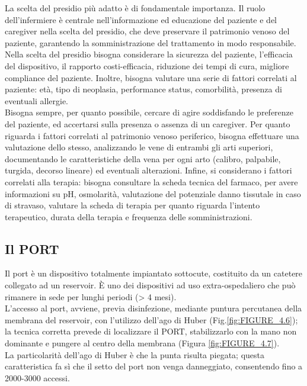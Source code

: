 La scelta del presidio più adatto è di fondamentale importanza. Il ruolo dell'infermiere è centrale 
nell'informazione ed educazione del paziente e del caregiver nella scelta del presidio, che deve preservare 
il patrimonio venoso del paziente, garantendo la somministrazione del trattamento in modo responsabile\cite{AIOMCVC}. 
Nella scelta del presidio bisogna considerare la sicurezza del paziente, l'efficacia del dispositivo, il rapporto 
costi-efficacia, riduzione dei tempi di cura, migliore compliance del paziente. Inoltre, bisogna valutare una serie 
di fattori correlati al paziente: età, tipo di  neoplasia, performance status, comorbilità, presenza 
di eventuali allergie\cite{AIOMCVC}.\\
Bisogna sempre, per quanto possibile, cercare di agire soddisfando le preferenze del paziente, 
ed accertarsi sulla presenza o assenza di un caregiver. Per quanto riguarda i fattori correlati al patrimonio 
venoso periferico, bisogna effettuare una valutazione dello stesso, analizzando le vene di entrambi gli arti superiori,
documentando le caratteristiche della vena per ogni arto (calibro, palpabile, turgida, decorso lineare) ed eventuali 
alterazioni\cite{AIOMCVC}. Infine, si considerano i fattori correlati alla terapia: bisogna consultare la scheda tecnica del farmaco,
per avere informazioni su pH, osmolarità, valutazione del potenziale danno tissutale in caso di stravaso, valutare la 
scheda di terapia per quanto riguarda l'intento terapeutico, durata della terapia e frequenza delle somministrazioni\cite{AIOMCVC}.

\subsection{Il PORT}

Il port è un dispositivo totalmente impiantato sottocute, costituito da un catetere collegato ad un reservoir\cite{AIOMCVC}.
È uno dei dispositivi ad uso extra-ospedaliero che può rimanere in sede per lunghi periodi (> 4 mesi)\cite{GAVECELTracc2021}.\\
L'accesso al port, avviene, previa disinfezione, mediante puntura percutanea della membrana del reservoir, con 
l'utilizzo dell'ago di Huber (Fig.\ref{fig:FIGURE_4.6}); la tecnica corretta prevede di localizzare il PORT,
stabilizzarlo con la mano non dominante e pungere al centro della membrana (Figura \ref{fig:FIGURE_4.7}).\\
La particolarità dell'ago di Huber è che la punta risulta piegata; questa caratteristica fa sì che il 
setto del port non venga danneggiato, consentendo fino a 2000-3000 accessi\cite{AIOMCVC}.

